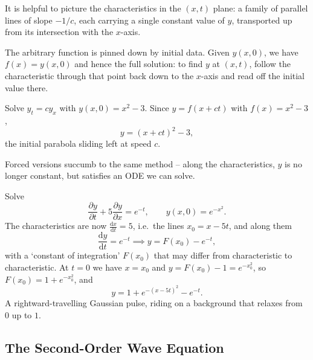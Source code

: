 \documentclass[a4paper]{scrartcl}
\begin{document}
It is helpful to picture the characteristics in the $(x, t)$ plane: a family of parallel lines of slope $-1/c$, each carrying a single constant value of $y$, transported up from its intersection with the $x$-axis.

\begin{center}
\end{center}

The arbitrary function is pinned down by initial data. Given $y(x, 0)$, we have $f(x) = y(x, 0)$ and hence the full solution: to find $y$ at $(x, t)$, follow the characteristic through that point back down to the $x$-axis and read off the initial value there.

\begin{example}
	Solve $y_t = c y_x$ with $y(x, 0) = x^2 - 3$. Since $y = f(x + ct)$ with $f(x) = x^2 - 3$,
	$$
	y = (x + ct)^2 - 3,
	$$
	the initial parabola sliding left at speed $c$.
\end{example}

Forced versions succumb to the same method -- along the characteristics, $y$ is no longer constant, but satisfies an ODE we can solve.

\begin{example}
	Solve
	$$
	\frac{\partial y}{\partial t} + 5 \frac{\partial y}{\partial x} = e^{-t}, \qquad y(x, 0) = e^{-x^2}.
	$$
	The characteristics are now $\frac{\mathrm{d}x}{\mathrm{d}t} = 5$, i.e.\ the lines $x_0 = x - 5t$, and along them
	$$
	\frac{\mathrm{d}y}{\mathrm{d}t} = e^{-t} \implies y = F(x_0) - e^{-t},
	$$
	with a `constant of integration' $F(x_0)$ that may differ from characteristic to characteristic. At $t = 0$ we have $x = x_0$ and $y = F(x_0) - 1 = e^{-x_0^2}$, so $F(x_0) = 1 + e^{-x_0^2}$, and
	$$
	y = 1 + e^{-(x - 5t)^2} - e^{-t}.
	$$
	A rightward-travelling Gaussian pulse, riding on a background that relaxes from $0$ up to $1$.
\end{example}

\subsection{The Second-Order Wave Equation}
\end{document}
